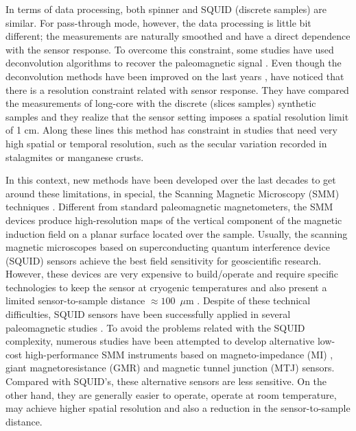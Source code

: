 \documentclass[draft,gc]{agutex}
\begin{document}
\begin{article}
In terms of data processing, both spinner and SQUID (discrete samples) 
are similar. For pass-through mode, however, the data 
processing is little bit different; the measurements are naturally 
smoothed and have a direct dependence with the sensor response. 
To overcome this constraint, some studies have used deconvolution 
algorithms to recover the paleomagnetic signal 
\citep{jackson2010, oda-xuan2014}. 
Even though the deconvolution methods have been improved on the 
last years \citep{jackson2010, lascu2012}, \citet{lascu2012} have 
noticed that there is a resolution constraint related with sensor 
response. They have compared the measurements of long-core with 
the discrete (slices samples) synthetic samples and they realize 
that the sensor setting imposes a spatial resolution limit of 1 cm. 
Along these lines this method has constraint in studies that need 
very high spatial or temporal resolution, such as the secular 
variation recorded in stalagmites or manganese crusts. 

In this context, new 
methods have been developed over the last decades to get around these limitations, in special, 
the Scanning Magnetic Microscopy (SMM) techniques \citep{kirschvink2008, oda2011, fu2014}. 
Different from 
standard paleomagnetic magnetometers, the SMM devices produce high-resolution maps of the 
vertical component of the magnetic induction field on a planar surface located over the 
sample. Usually, the scanning magnetic microscopes based on superconducting quantum 
interference device (SQUID) sensors achieve the best field sensitivity for geoscientific 
research. However, these devices are very expensive to build/operate and require specific 
technologies to keep the sensor at cryogenic temperatures and also present a limited 
sensor-to-sample distance $\approx 100$~$\mu$m \citep{baudenbacher2003, fong2005}. 
Despite of these technical difficulties, SQUID sensors have been successfully applied 
in several paleomagnetic studies 
\citep{gattacceca2006, weiss2007b, oda2011, fu2014, kirschvink2015}. 
To avoid the problems related with the SQUID complexity, numerous studies have been 
attempted to develop alternative low-cost high-performance SMM instruments based on 
magneto-impedance (MI) \citep{uehara2007, uehara2008}, giant magnetoresistance (GMR) 
\citep{hankard2009} and magnetic tunnel junction (MTJ) \citep{lima2014} sensors. 
Compared with SQUID's, these alternative sensors are less sensitive. On the other 
hand, they are generally easier to operate, operate at room temperature, 
may achieve higher spatial resolution and also a reduction in the sensor-to-sample 
distance.


\end{article}
\end{document}
